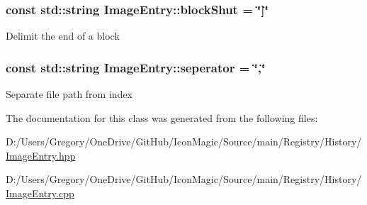 \subsubsection[{block\+Shut}]{\setlength{\rightskip}{0pt plus 5cm}const std\+::string Image\+Entry\+::block\+Shut = \char`\"{}\mbox{]}\char`\"{}\hspace{0.3cm}{\ttfamily [static]}}\label{class_image_entry_a3b9e7171180470a60857f679fe34dc58}
Delimit the end of a block \hypertarget{class_image_entry_ad4a7cf6088ced1381d05d3f1fcb7ba92}{}
\subsubsection[{seperator}]{\setlength{\rightskip}{0pt plus 5cm}const std\+::string Image\+Entry\+::seperator = \char`\"{},\char`\"{}\hspace{0.3cm}{\ttfamily [static]}}\label{class_image_entry_ad4a7cf6088ced1381d05d3f1fcb7ba92}
Separate file path from index 

The documentation for this class was generated from the following files\+:\begin{DoxyCompactItemize}
\item 
D\+:/\+Users/\+Gregory/\+One\+Drive/\+Git\+Hub/\+Icon\+Magic/\+Source/main/\+Registry/\+History/\hyperlink{_image_entry_8hpp}{Image\+Entry.\+hpp}\item 
D\+:/\+Users/\+Gregory/\+One\+Drive/\+Git\+Hub/\+Icon\+Magic/\+Source/main/\+Registry/\+History/\hyperlink{_image_entry_8cpp}{Image\+Entry.\+cpp}\end{DoxyCompactItemize}
